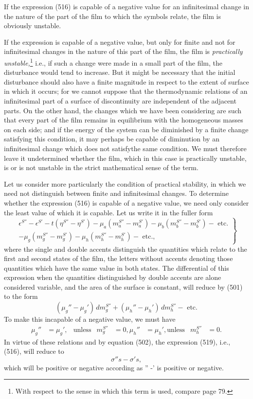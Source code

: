 \documentclass[12pt]{article}
\begin{document}
{If the expression (516) is capable of a negative value for an infinitesimal change in the nature of the part of the film to which the symbols relate, the film is obviously unstable.

If the expression is capable of a negative value, but only for finite and not for infinitesimal changes in the nature of this part of the film, the film is \textit{practically unstable,}\footnote{With respect to the sense in which this term is used, compare page 79.} i.e., if such a change were made in a small part of the film, the disturbance would tend to increase. But it might be necessary that the initial disturbance should also have a finite magnitude in respect to the extent of surface in which it occurs; for we cannot suppose that the thermodynamic relations of an infinitesimal part of a surface of discontinuity are independent of the adjacent parts. On the other hand, the changes which we have been considering are such that every part of the film remains in equilibrium with the homogeneous masses on each side; and if the energy of the system can be diminished by a finite change satisfying this condition, it may perhaps be capable of diminution by an infinitesimal change which does not satisfythe same condition. We must therefore leave it undetermined whether the film, which in this case is practically unstable, is or is not unstable in the strict mathematical sense of the term.

Let us consider more particularly the condition of practical stability, in which we need not distinguish between finite and infinitesimal changes. To determine whether the expression (516) is capable of a negative value, we need only consider the least value of which it is capable. Let us write it in the fuller form
\begin{equation} 
\left. \begin{array}{r} \epsilon^{S''}-\epsilon^{S'}- t(\eta^{S''}- \eta^{S'})-\mu_a(m_a^{S''}-m_a^{S'})-\mu_b(m_b^{S''}-m_b^{S'})-\text{ etc.}  \\
-\mu_g(m_g^{S''}-m_g^{S'})-\mu_h(m_h^{S''}-m_h^{S'}) - \text{ etc.}, \end{array} \right\} \label{519}\end{equation}
where the single and double accents distinguish the quantities which relate to the first and second states of the film, the letters without accents denoting those quantities which have the same value in both states. The differential of this expression when the quantities distinguished by double accents are alone considered variable, and the area of the surface is constant, will reduce by (501) to the form
$$ (\mu_g''-\mu_g') \, d m_g^{S''}+(\mu_h''-\mu_h') \, d m_h^{S''}- \text{ etc.} $$
To make this incapable of a negative value, we must have
\begin{align*}
\mu_g'' &= \mu_g', & \text{unless} & m_g^{S''} &= 0,
\mu_h'' &= \mu_h', \text{unless} & m_h^{S''} &= 0. \end{align*}
In virtue of these relations and by equation (502), the expression (519), i.e., (516), will reduce to
$$\sigma''s - \sigma's,$$
which will be positive or negative according as
\eqs \sigma'' -\sigma'  \label{520} \eqe
is positive or negative.

}
\end{document}
